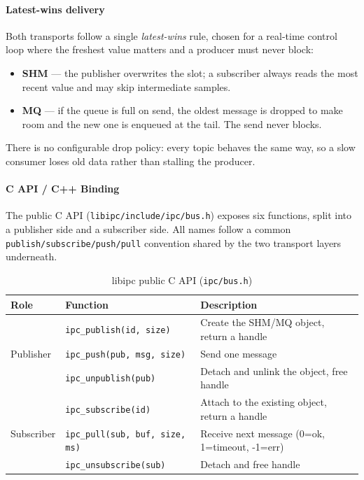 \documentclass[12pt,a4paper]{article}
\begin{document}
\paragraph{Latest-wins delivery}

Both transports follow a single \emph{latest-wins} rule, chosen for a real-time
control loop where the freshest value matters and a producer must never block:

\begin{itemize}
  \item \textbf{SHM} --- the publisher overwrites the slot; a subscriber always
        reads the most recent value and may skip intermediate samples.
  \item \textbf{MQ} --- if the queue is full on send, the oldest message is
        dropped to make room and the new one is enqueued at the tail. The send
        never blocks.
\end{itemize}

There is no configurable drop policy: every topic behaves the same way, so a
slow consumer loses old data rather than stalling the producer.

\paragraph{C API / C++ Binding}

The public C API (\texttt{libipc/include/ipc/bus.h}) exposes six functions, split
into a publisher side and a subscriber side. All names follow a common
\texttt{publish/subscribe/push/pull} convention shared by the two transport
layers underneath.

\begin{table}[H]
\centering
\begin{tabular}{lll}
\hline
\textbf{Role} & \textbf{Function} & \textbf{Description} \\
\hline
\multirow{3}{*}{Publisher}
  & \texttt{ipc\_publish(id, size)}        & Create the SHM/MQ object, return a handle \\
  & \texttt{ipc\_push(pub, msg, size)}     & Send one message \\
  & \texttt{ipc\_unpublish(pub)}           & Detach and unlink the object, free handle \\
\hline
\multirow{3}{*}{Subscriber}
  & \texttt{ipc\_subscribe(id)}            & Attach to the existing object, return a handle \\
  & \texttt{ipc\_pull(sub, buf, size, ms)} & Receive next message (0=ok, 1=timeout, -1=err) \\
  & \texttt{ipc\_unsubscribe(sub)}         & Detach and free handle \\
\hline
\end{tabular}
\caption{libipc public C API (\texttt{ipc/bus.h})}
\end{table}
\end{document}

